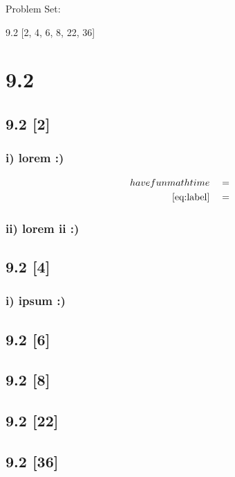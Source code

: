 \documentclass{article}
\begin{document}
{\large \noindent Problem Set:}

\par 9.2 [2, 4, 6, 8, 22, 36]
\vspace{5mm}

\noindent \hrulefill

\section*{9.2}
\setcounter{equation}{0}

\subsection*{9.2 [2]}

\subsubsection*{i) lorem :)}

\begin{align}
    \label{eq:label}
    have fun math time && &=
    \\
    \label{eq:label2}
    \eqref{eq:label} && &=
\end{align}
\subsubsection*{ii) lorem ii :)}

\subsection*{9.2 [4]}

\subsubsection*{i) ipsum :)}

\subsection*{9.2 [6]}
\subsection*{9.2 [8]}
\subsection*{9.2 [22]}
\subsection*{9.2 [36]}
\end{document}
